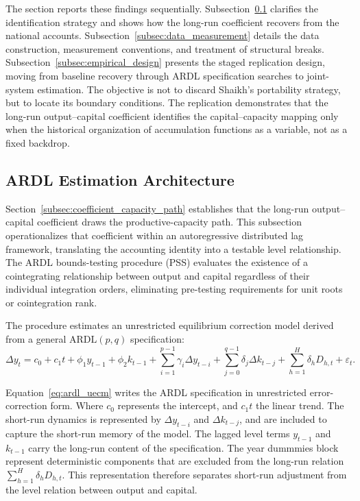 \documentclass[11pt]{article}
\begin{document}
The section reports these findings sequentially. Subsection~\ref{subsec:shaikh_identification_strategy} clarifies the identification strategy and shows how the long-run coefficient recovers from the national accounts. Subsection~\ref{subsec:data_measurement} details the data construction, measurement conventions, and treatment of structural breaks. Subsection~\ref{subsec:empirical_design} presents the staged replication design, moving from baseline recovery through ARDL specification searches to joint-system estimation. The objective is not to discard Shaikh's portability strategy, but to locate its boundary conditions. The replication demonstrates that the long-run output--capital coefficient identifies the capital--capacity mapping only when the historical organization of accumulation functions as a variable, not as a fixed backdrop.

\subsection{ARDL Estimation Architecture}
\label{subsec:shaikh_identification_strategy}

Section~\ref{subsec:coefficient_capacity_path} establishes that the long-run output--capital coefficient draws the productive-capacity path. This subsection operationalizes that coefficient within an autoregressive distributed lag framework, translating the accounting identity into a testable level relationship. The ARDL bounds-testing procedure \citep{Pesaran2001} (PSS) evaluates the existence of a cointegrating relationship between output and capital regardless of their individual integration orders, eliminating pre-testing requirements for unit roots or cointegration rank.

The procedure estimates an unrestricted equilibrium correction model derived from a general $\text{ARDL}(p, q)$ specification:
\begin{equation}
\Delta y_t
= c_0 + c_1 t
+ \phi_1 y_{t-1}
+ \phi_2 k_{t-1}
+ \sum_{i=1}^{p-1} \gamma_i \Delta y_{t-i}
+ \sum_{j=0}^{q-1} \delta_j \Delta k_{t-j}
+ \sum_{h=1}^{H} \delta_h D_{h,t}
+ \varepsilon_t .
\label{eq:ardl_uecm}
\end{equation}

Equation~\eqref{eq:ardl_uecm} writes the ARDL specification in unrestricted error-correction form. Where $c_0$ represents the intercept, and $c_1t$ the linear trend. The short-run dynamics is represented by $\Delta y_{t-i}$ and $\Delta k_{t-j}$, and are included to capture the short-run memory of the model. The lagged level terms $y_{t-1}$ and $k_{t-1}$ carry the long-run content of the specification. The year dummmies block represent deterministic components that are excluded from the long-run relation $\sum_{h=1}^{H}\delta_h D_{h,t}$. This representation therefore separates short-run adjustment from the level relation between output and capital.
\end{document}
